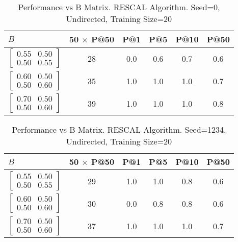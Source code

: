 \documentclass{tufte-handout}
\begin{document}
\begin{table}[htbp]
  \begin{tabular}{l c c c c c}
    $B$ & 50 $\times$ P@50 & P@1 & P@5 & P@10 & P@50 \\ \toprule
  $\begin{bmatrix} 0.55 & 0.50 \\0.50 &0.55 \end{bmatrix}$ & 28 & 0.0 & 0.6 & 0.7 & 0.6 \\
  $\begin{bmatrix} 0.60 & 0.50 \\0.50 &0.60 \end{bmatrix}$ & 35 & 1.0 & 1.0 & 1.0 & 0.7 \\
  $\begin{bmatrix} 0.70 & 0.50 \\0.50 &0.60 \end{bmatrix}$ & 39 & 1.0 & 1.0 & 1.0 & 0.8 \\
  \end{tabular}
  \caption{Performance vs B Matrix. RESCAL Algorithm. Seed=0, Undirected, Training Size=20}
  \label{tab:perf-vs-b}
\end{table}

\begin{table}[!htbp]
  \begin{tabular}{l c c c c c}
    $B$ & 50 $\times$ P@50 & P@1 & P@5 & P@10 & P@50 \\ \toprule
  $\begin{bmatrix} 0.55 & 0.50 \\0.50 &0.55 \end{bmatrix}$ & 29 & 1.0 & 1.0 & 0.8 & 0.6 \\
  $\begin{bmatrix} 0.60 & 0.50 \\0.50 &0.60 \end{bmatrix}$ & 30 & 0.0 & 0.8 & 0.8 & 0.6 \\
  $\begin{bmatrix} 0.70 & 0.50 \\0.50 &0.60 \end{bmatrix}$ & 37 & 1.0 & 1.0 & 1.0 & 0.7 \\


  \end{tabular}
  \caption{Performance vs B Matrix. RESCAL Algorithm. Seed=1234, Undirected, Training Size=20}
  \label{tab:perf-vs-b}
\end{table}

\pagebreak
\end{document}
